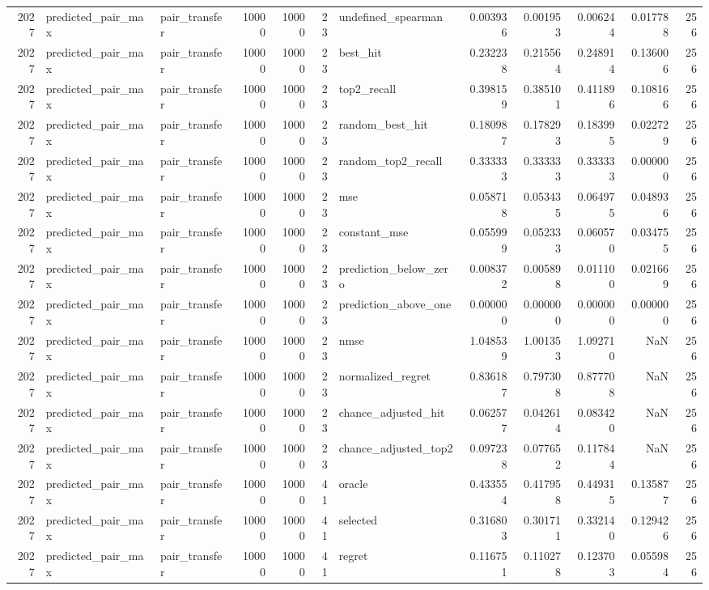 \begin{tabular}{rllrrrlrrrrr}
2027 & predicted_pair_max & pair_transfer & 10000 & 10000 & 23 & undefined_spearman & 0.003936 & 0.001953 & 0.006244 & 0.017788 & 256 \\
2027 & predicted_pair_max & pair_transfer & 10000 & 10000 & 23 & best_hit & 0.232238 & 0.215564 & 0.248914 & 0.136006 & 256 \\
2027 & predicted_pair_max & pair_transfer & 10000 & 10000 & 23 & top2_recall & 0.398159 & 0.385101 & 0.411896 & 0.108166 & 256 \\
2027 & predicted_pair_max & pair_transfer & 10000 & 10000 & 23 & random_best_hit & 0.180987 & 0.178293 & 0.183995 & 0.022729 & 256 \\
2027 & predicted_pair_max & pair_transfer & 10000 & 10000 & 23 & random_top2_recall & 0.333333 & 0.333333 & 0.333333 & 0.000000 & 256 \\
2027 & predicted_pair_max & pair_transfer & 10000 & 10000 & 23 & mse & 0.058718 & 0.053435 & 0.064975 & 0.048936 & 256 \\
2027 & predicted_pair_max & pair_transfer & 10000 & 10000 & 23 & constant_mse & 0.055999 & 0.052333 & 0.060570 & 0.034755 & 256 \\
2027 & predicted_pair_max & pair_transfer & 10000 & 10000 & 23 & prediction_below_zero & 0.008372 & 0.005898 & 0.011100 & 0.021669 & 256 \\
2027 & predicted_pair_max & pair_transfer & 10000 & 10000 & 23 & prediction_above_one & 0.000000 & 0.000000 & 0.000000 & 0.000000 & 256 \\
2027 & predicted_pair_max & pair_transfer & 10000 & 10000 & 23 & nmse & 1.048539 & 1.001353 & 1.092710 & NaN & 256 \\
2027 & predicted_pair_max & pair_transfer & 10000 & 10000 & 23 & normalized_regret & 0.836187 & 0.797308 & 0.877708 & NaN & 256 \\
2027 & predicted_pair_max & pair_transfer & 10000 & 10000 & 23 & chance_adjusted_hit & 0.062577 & 0.042614 & 0.083420 & NaN & 256 \\
2027 & predicted_pair_max & pair_transfer & 10000 & 10000 & 23 & chance_adjusted_top2 & 0.097238 & 0.077652 & 0.117844 & NaN & 256 \\
2027 & predicted_pair_max & pair_transfer & 10000 & 10000 & 41 & oracle & 0.433554 & 0.417958 & 0.449315 & 0.135877 & 256 \\
2027 & predicted_pair_max & pair_transfer & 10000 & 10000 & 41 & selected & 0.316803 & 0.301711 & 0.332140 & 0.129426 & 256 \\
2027 & predicted_pair_max & pair_transfer & 10000 & 10000 & 41 & regret & 0.116751 & 0.110278 & 0.123703 & 0.055984 & 256 \\

\end{tabular}
